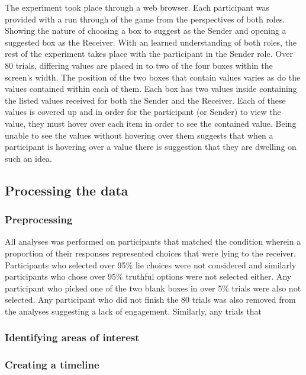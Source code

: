 \documentclass[man, floatsintext]{apa7}
\begin{document}
The experiment took place through a web browser. Each participant was provided with a run through of the game from the perspectives of both roles. Showing the nature of choosing a box to suggest as the Sender and opening a suggested box as the Receiver. With an learned understanding of both roles, the rest of the experiment takes place with the participant in the Sender role. Over 80 trials, differing values are placed in to two of the four boxes within the screen's width. The position of the two boxes that contain values varies as do the values contained within each of them. Each box has two values inside containing the listed values received for both the Sender and the Receiver. Each of these values is covered up and in order for the participant (or Sender) to view the value, they must hover over each item in order to see the contained value. Being unable to see the values without hovering over them suggests that when a participant is hovering over a value there is suggestion that they are dwelling on such an idea.


\subsection{Processing the data}

\subsubsection{Preprocessing}

All analyses was performed on participants that matched the condition wherein a proportion of their responses represented choices that were lying to the receiver. Participants who selected over 95\% lie choices were not considered and similarly participants who chose over 95\% truthful options were not selected either. Any participant who picked one of the two blank boxes in over 5\% trials were also not selected. Any participant who did not finish the 80 trials was also removed from the analyses suggesting a lack of engagement. Similarly, any trials that 

\subsubsection{Identifying areas of interest}

\subsubsection{Creating a timeline}
\end{document}

